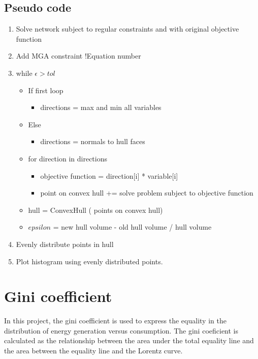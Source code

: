 \subsection{Pseudo code}

\begin{enumerate}[label={}]
	\item Solve network subject to regular constraints and with original objective function
	\item Add MGA constraint !Equation number
	\item while $\epsilon>tol$
	\begin{itemize}[label={}]
		\item If first loop
		\begin{itemize}[label={}]
			\item directions = max and min all variables
		\end{itemize}
		\item Else
		\begin{itemize}[label={}]
			\item directions = normals to hull faces
		\end{itemize}
		\item for direction in directions
		\begin{itemize}[label={}]
			\item objective function = direction[i] * variable[i]
			\item point on convex hull += solve problem subject to objective function
		\end{itemize}
		\item hull = ConvexHull ( points on convex hull)
		\item $epsilon$ = new hull volume - old hull volume / hull volume
	\end{itemize}
	\item Evenly distribute points in hull 
	\item Plot histogram using evenly distributed points. 
\end{enumerate}








\section{Gini coefficient}

In this project, the gini coefficient is used to express the equality in the distribution of energy generation versus consumption. The gini coeficient is calculated as the relationship between the area under the total equality line and the area between the equality line and the Lorentz curve. 

